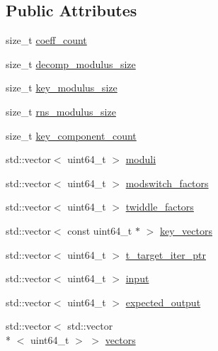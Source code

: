 \subsection*{Public Attributes}
\begin{DoxyCompactItemize}
\item 
size\-\_\-t \hyperlink{structKeySwitchTestVector_a95aa4da3c5518ef78bcc8de60339fcbf}{coeff\-\_\-count}
\item 
size\-\_\-t \hyperlink{structKeySwitchTestVector_a553ed9a4e56035cc083f2b29cc1d16a6}{decomp\-\_\-modulus\-\_\-size}
\item 
size\-\_\-t \hyperlink{structKeySwitchTestVector_a98001c403e5ad60e03d188ca1bc2d0a7}{key\-\_\-modulus\-\_\-size}
\item 
size\-\_\-t \hyperlink{structKeySwitchTestVector_a700faac161b8de302d05e4cdb24080b6}{rns\-\_\-modulus\-\_\-size}
\item 
size\-\_\-t \hyperlink{structKeySwitchTestVector_adbffef31865ff107c1fc5ece85028d18}{key\-\_\-component\-\_\-count}
\item 
std\-::vector$<$ uint64\-\_\-t $>$ \hyperlink{structKeySwitchTestVector_a093fb1d7c028277e953c73e14c4bdc38}{moduli}
\item 
std\-::vector$<$ uint64\-\_\-t $>$ \hyperlink{structKeySwitchTestVector_a5d7c8ad32a914bb8d8ecf78a13f911ca}{modswitch\-\_\-factors}
\item 
std\-::vector$<$ uint64\-\_\-t $>$ \hyperlink{structKeySwitchTestVector_a3299b1bfac2b08cfa386236a8e4b2c63}{twiddle\-\_\-factors}
\item 
std\-::vector$<$ const uint64\-\_\-t $\ast$ $>$ \hyperlink{structKeySwitchTestVector_a3efccd8f33a478bb9b447e38eb38662e}{key\-\_\-vectors}
\item 
std\-::vector$<$ uint64\-\_\-t $>$ \hyperlink{structKeySwitchTestVector_a87c4ef64d069c11709451f4fe7b4a5fd}{t\-\_\-target\-\_\-iter\-\_\-ptr}
\item 
std\-::vector$<$ uint64\-\_\-t $>$ \hyperlink{structKeySwitchTestVector_ada92bec84019ee1f4cad5ebdbc1a0be3}{input}
\item 
std\-::vector$<$ uint64\-\_\-t $>$ \hyperlink{structKeySwitchTestVector_ad9e47be1cfb9a7be31cfbbd3edfad593}{expected\-\_\-output}
\item 
std\-::vector$<$ std\-::vector\\*
$<$ uint64\-\_\-t $>$ $>$ \hyperlink{structKeySwitchTestVector_a00c0158e4d33300c0d34e9ca2be66a51}{vectors}
\end{DoxyCompactItemize}


